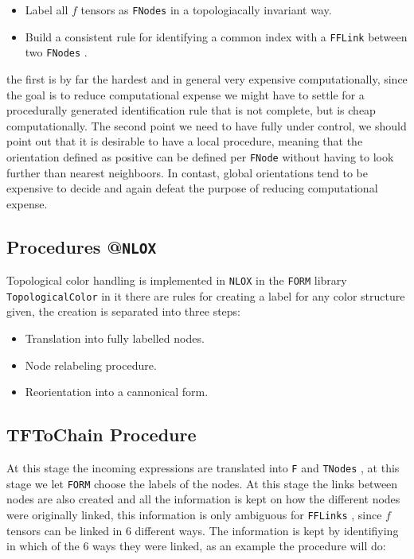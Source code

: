 \documentclass[a4paper]{article}
\def \FNode{\texttt{FNode} }
\def \FNodes{\texttt{FNodes} }
\def \FFLink{\texttt{FFLink} }
\def \FFLinks{\texttt{FFLinks} }
\def \TNodes{\texttt{TNodes} }
\def \NLOX{\texttt{NLOX} }
\begin{document}
\begin{itemize}
 \item Label all $f$ tensors as \FNodes in a topologiacally invariant way.
 \item Build a consistent rule for identifying a common index with a \FFLink between two \FNodes.
\end{itemize}
the first is by far the hardest and in general very expensive computationally, since the goal is to reduce computational expense we might have to settle for a procedurally generated identification rule that is not complete, but is cheap computationally.
The second point we need to have fully under control, we should point out that it is desirable 
to have a local procedure, meaning that the orientation defined as positive can be defined per \FNode
without having to look further than nearest neighboors. In contast, global orientations tend to be expensive 
to decide and again defeat the purpose of reducing computational expense.\\

\subsection{Procedures @\NLOX}
Topological color handling is implemented in \NLOX in the \texttt{FORM} library \texttt{TopologicalColor} in 
it there are rules for creating a label for any color structure given, the creation is separated into three 
steps:\\

\begin{itemize}
\item Translation into fully labelled nodes.\\
\item Node relabeling procedure.\\
\item Reorientation into a cannonical form.\\
\end{itemize}

\subsection{TFToChain Procedure}
At this stage the incoming expressions are translated into \texttt{F} and \TNodes, at this stage we let 
\texttt{FORM} choose the labels of the nodes. At this stage the links between nodes are also created and 
all the information is kept on how the different nodes were originally linked, this information is 
only ambiguous for \FFLinks, since $f$ tensors can be linked in $6$ different ways. The information
is kept by identifiying in which of the $6$ ways they were linked, as an example the procedure 
will do:
\end{document}
